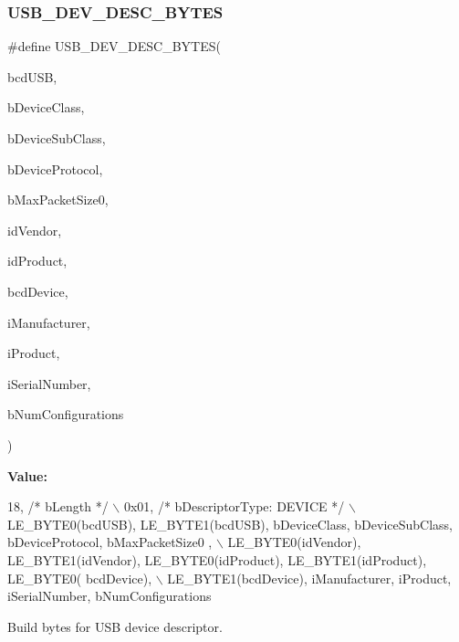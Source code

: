\subsubsection{\texorpdfstring{U\+S\+B\+\_\+\+D\+E\+V\+\_\+\+D\+E\+S\+C\+\_\+\+B\+Y\+T\+ES}{USB\_DEV\_DESC\_BYTES}}
{\footnotesize\ttfamily \#define U\+S\+B\+\_\+\+D\+E\+V\+\_\+\+D\+E\+S\+C\+\_\+\+B\+Y\+T\+ES(\begin{DoxyParamCaption}\item[{}]{bcd\+U\+SB,  }\item[{}]{b\+Device\+Class,  }\item[{}]{b\+Device\+Sub\+Class,  }\item[{}]{b\+Device\+Protocol,  }\item[{}]{b\+Max\+Packet\+Size0,  }\item[{}]{id\+Vendor,  }\item[{}]{id\+Product,  }\item[{}]{bcd\+Device,  }\item[{}]{i\+Manufacturer,  }\item[{}]{i\+Product,  }\item[{}]{i\+Serial\+Number,  }\item[{}]{b\+Num\+Configurations }\end{DoxyParamCaption})}

{\bfseries Value\+:}
\begin{DoxyCode}
18,       \textcolor{comment}{/* bLength */}                                                                                    
              \(\backslash\)
        0x01, \textcolor{comment}{/* bDescriptorType: DEVICE */}                                                                
                  \(\backslash\)
        LE\_BYTE0(bcdUSB), LE\_BYTE1(bcdUSB), bDeviceClass, bDeviceSubClass, bDeviceProtocol, bMaxPacketSize0
      ,           \(\backslash\)
        LE\_BYTE0(idVendor), LE\_BYTE1(idVendor), LE\_BYTE0(idProduct), LE\_BYTE1(idProduct), LE\_BYTE0(
      bcdDevice),         \(\backslash\)
        LE\_BYTE1(bcdDevice), iManufacturer, iProduct, iSerialNumber, bNumConfigurations
\end{DoxyCode}
Build bytes for U\+SB device descriptor. \mbox{\label{group__usb__protocol__group_gaf73b12465cc4aa29176a726a12d82eb2}} 

